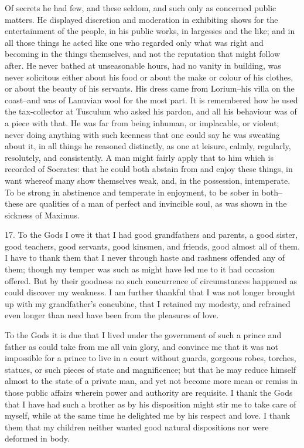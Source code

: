 \documentclass{book}
\begin{document}
Of secrets he had few, and these seldom, and such only as concerned
public matters. He displayed discretion and moderation in exhibiting
shows for the entertainment of the people, in his public works, in
largesses and the like; and in all those things he acted like one who
regarded only what was right and becoming in the things themselves,
and not the reputation that might follow after. He never bathed at
unseasonable hours, had no vanity in building, was never solicitous
either about his food or about the make or colour of his clothes, or
about the beauty of his servants. His dress came from Lorium--his
villa on the coast--and was of Lanuvian wool for the most part. It is
remembered how he used the tax-collector at Tusculum who asked his
pardon, and all his behaviour was of a piece with that. He was far from
being inhuman, or implacable, or violent; never doing anything with such
keenness that one could say he was sweating about it, in all things he
reasoned distinctly, as one at leisure, calmly, regularly, resolutely,
and consistently. A man might fairly apply that to him which is recorded
of Socrates: that he could both abstain from and enjoy these things,
in want whereof many show themselves weak, and, in the possession,
intemperate. To be strong in abstinence and temperate in enjoyment, to
be sober in both--these are qualities of a man of perfect and invincible
soul, as was shown in the sickness of Maximus.

17. To the Gods I owe it that I had good grandfathers and parents, a
good sister, good teachers, good servants, good kinsmen, and friends,
good almost all of them. I have to thank them that I never through
haste and rashness offended any of them; though my temper was such as
might have led me to it had occasion offered. But by their goodness no
such concurrence of circumstances happened as could discover my
weakness. I am further thankful that I was not longer brought up with my
grandfather's concubine, that I retained my modesty, and refrained even
longer than need have been from the pleasures of love.

To the Gods it is due that I lived under the government of such a
prince and father as could take from me all vain glory, and convince
me that it was not impossible for a prince to live in a court without
guards, gorgeous robes, torches, statues, or such pieces of state and
magnificence; but that he may reduce himself almost to the state of a
private man, and yet not become more mean or remiss in those public
affairs wherein power and authority are requisite. I thank the Gods that
I have had such a brother as by his disposition might stir me to take
care of myself, while at the same time he delighted me by his respect
and love. I thank them that my children neither wanted good natural
dispositions nor were deformed in body.
\end{document}
